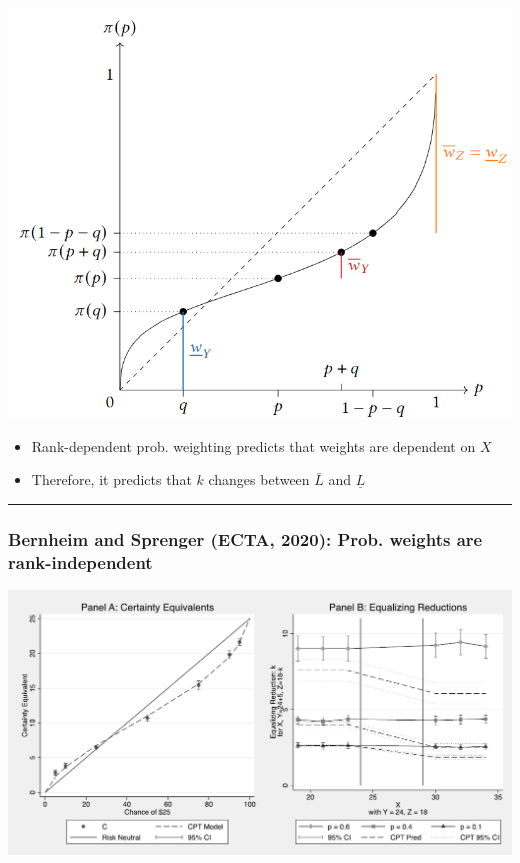 \documentclass[
  letterpaper,
  DIV=11,
  numbers=noendperiod]{scrartcl}
\providecommand{\tightlist}{%
  \setlength{\itemsep}{0pt}\setlength{\parskip}{0pt}}\usepackage{longtable,booktabs,array}
\begin{document}
\includegraphics[width=1\linewidth,height=\textheight,keepaspectratio]{figures/CPTWeights.png}

\begin{itemize}
\tightlist
\item
  Rank-dependent prob. weighting predicts that weights are dependent on
  \(X\)
\item
  Therefore, it predicts that \(k\) changes between \(\bar{L}\) and
  \(\underline{L}\)
\end{itemize}

\begin{center}\rule{0.5\linewidth}{0.5pt}\end{center}

\subsubsection{Bernheim and Sprenger (ECTA, 2020): Prob. weights are
rank-independent}\label{bernheim-and-sprenger-ecta-2020-prob.-weights-are-rank-independent}

\includegraphics[width=0.6\linewidth,height=\textheight,keepaspectratio]{figures/CPTTest.png}
\end{document}
